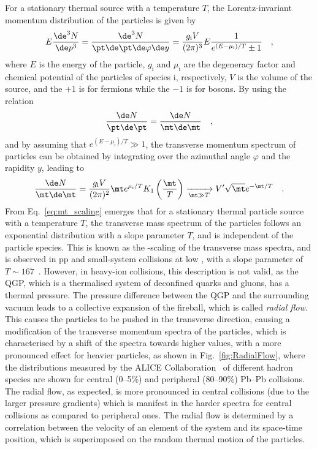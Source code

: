 For a stationary thermal source with a temperature $T$, the Lorentz-invariant momentum distribution of the particles is given by
\begin{equation*}
    E\frac{\de^3 N}{\de p^3} = \frac{\de^3 N}{\pt\de\pt\de\varphi\de y} = \frac{g_\mathrm{i}V}{(2\pi)^3} E \frac{1}{e^{(E-\mu_\mathrm{i})/T}\pm1}\quad ,
\end{equation*}
where $E$ is the energy of the particle, $g_\mathrm{i}$ and $\mu_\mathrm{i}$ are the degeneracy factor and chemical potential of the particles of species i, respectively, $V$ is the volume of the source, and the +1 is for fermions while the $-1$ is for bosons. By using the relation
\begin{equation*}
  \frac{\de N}{\pt\de\pt} = \frac{\de N}{\mt\de\mt}\quad ,
\end{equation*}
and by assuming that $e^{(E-\mu_\mathrm{i})/T}\gg1$, the transverse momentum spectrum of particles can be obtained by integrating over the azimuthal angle $\varphi$ and the rapidity $y$, leading to
\begin{equation}\label{eq:mt_scaling}
    \frac{\de N}{\mt\de\mt} = \frac{g_\mathrm{i}V}{(2\pi)^2} \mt e^{\mu_\mathrm{i}/T} K_1\left(\frac{\mt}{T}\right) \xrightarrow[\mt\gg T]{} V'\sqrt{\mt}e^{-\mt/T}\quad .
\end{equation}
From Eq.~\ref{eq:mt_scaling} emerges that for a stationary thermal particle source with a temperature $T$, the transverse mass spectrum of the particles follows an exponential distribution with a slope parameter $T$, and is independent of the particle species. This is known as the \mt-scaling of the transverse mass spectra, and is observed in pp and small-system collisions at low \sqs, with a slope parameter of $T\sim167$~\mev. However, in heavy-ion collisions, this description is not valid, as the QGP, which is a thermalised system of deconfined quarks and gluons, has a thermal pressure. The pressure difference between the QGP and the surrounding vacuum leads to a collective expansion of the fireball, which is called \emph{radial flow}. This causes the particles to be pushed in the transverse direction, causing a modification of the transverse momentum spectra of the particles, which is characterised by a shift of the spectra towards higher \pt values, with a more pronounced effect for heavier particles, as shown in Fig.~\ref{fig:RadialFlow}, where the \pt distributions measured by the ALICE Collaboration~\cite{ALICE:2022wpn} of different hadron species are shown for central (0--5\%) and peripheral (80--90\%) Pb--Pb collisions. The radial flow, as expected, is more pronounced in central collisions (due to the larger pressure gradients) which is manifest in the harder \pt spectra for central collisions as compared to peripheral ones. The radial flow is determined by a correlation between the velocity of an element of the system and its space-time position, which is superimposed on the random thermal motion of the particles.
